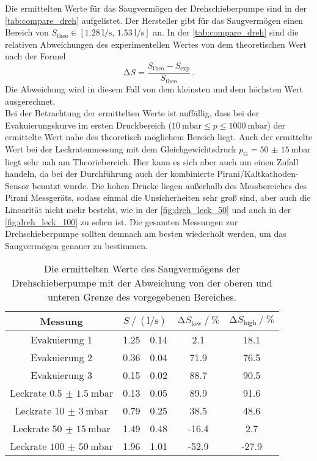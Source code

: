 \noindent Die ermittelten Werte für das Saugvermögen der Drehschieberpumpe sind in der \autoref{tab:compare_dreh} aufgelistet. Der Hersteller gibt für das Saugvermögen einen Bereich 
von $ S_\text{theo} \in [\SI{1.28}{\litre\per\second},\, \SI{1.53}{\litre\per\second}]$ an. In der \autoref{tab:compare_dreh} sind die relativen Abweichungen des experimentellen Wertes von 
dem theoretischen Wert nach der Formel 
\begin{equation}
    \increment S = \frac{S_\text{theo} - S_\text{exp}}{S_\text{theo}}\, .
    \label{eqn:rel_abw}
\end{equation}
Die Abweichung wird in diesem Fall von dem kleinsten und dem höchsten Wert ausgerechnet. \\
Bei der Betrachtung der ermittelten Werte ist auffällig, dass bei der Evakuierungskurve im ersten Druckbereich ($\SI{10}{\milli\bar} \leq p \leq \SI{1000}{\milli\bar}$) der ermittelte 
Wert nahe des theoretisch möglichem Bereich liegt. Auch der ermittelte Wert bei der Leckratenmessung mit dem Gleichgewichtsdruck $p_\text{G} = \SI{50(15)}{\milli\bar}$ liegt sehr nah am Theoriebereich. 
Hier kann es sich aber auch um einen Zufall handeln, da bei der Durchführung auch der kombinierte Pirani/Kaltkathoden-Sensor benutzt wurde. Die hohen Drücke liegen außerhalb des Messbereiches des Pirani Messgeräts, 
sodass einmal die Unsicherheiten sehr groß sind, aber auch die Linearität nicht mehr besteht, wie in der \autoref{fig:dreh_leck_50} und auch in der \autoref{fig:dreh_leck_100} zu sehen ist. 
Die gesamten Messungen zur Drehschieberpumpe sollten demnach am besten wiederholt werden, um das Saugvermögen genauer zu bestimmen. 

\begin{table}
    \centering
    \caption{Die ermittelten Werte des Saugvermögens der Drehschieberpumpe mit der Abweichung von der oberen und unteren Grenze des vorgegebenen Bereiches.}
    \label{tab:compare_dreh}
    \begin{tabular}{c  S @{${}\pm{}$} S  S[table-format=2.1] S[table-format=3.1]}
        \toprule
        {Messung} &  & {$\increment S_\text{low} \mathbin{/} \si{\percent}$} & {$\increment S_\text{high} \mathbin{/} \si{\percent}$} \\ 
        \midrule
        Evakuierung 1                       & 1.25 & 0.14 &  2.1 &  18.1\\
        Evakuierung 2                       & 0.36 & 0.04 & 71.9 &  76.5\\
        Evakuierung 3                       & 0.15 & 0.02 & 88.7 &  90.5\\
        Leckrate $\SI{0.5(15)}{\milli\bar}$ & 0.13 & 0.05 & 89.9 &  91.6\\
        Leckrate $\SI{10(3)}{\milli\bar}$   & 0.79 & 0.25 & 38.5 &  48.6\\
        Leckrate $\SI{50(15)}{\milli\bar}$  & 1.49 & 0.48 &-16.4 &   2.7\\
        Leckrate $\SI{100(50)}{\milli\bar}$ & 1.96 & 1.01 &-52.9 & -27.9\\
        \bottomrule
    \end{tabular}
\end{table}

